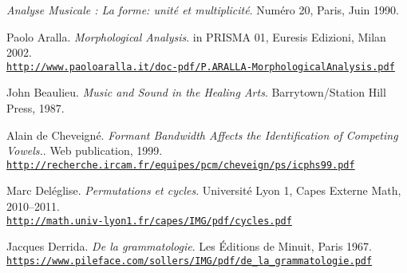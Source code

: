 \renewcommand{\bibname}{References
}

\renewcommand\bibpreamble{$\rightarrow$ The references to go further or deeper for advanced readers are prepended by an asterisk.}

\begin{thebibliography}{99}
\thispagestyle{empty}
		
	\textit{Analyse Musicale : La forme: unité et multiplicité}. Numéro 20, Paris, Juin 1990.
	
	Paolo Aralla. \textit{Morphological Analysis}. in PRISMA 01, Euresis Edizioni, Milan 2002.\\ 
	\href{http://www.paoloaralla.it/doc-pdf/P.ARALLA-MorphologicalAnalysis.pdf}{\scriptsize{\texttt{http://www.paoloaralla.it/doc-pdf/P.ARALLA-MorphologicalAnalysis.pdf}}} \normalsize{}
	
	John Beaulieu. \textit{Music and Sound in the Healing Arts}. Barrytown/Station Hill Press, 1987.
	
	Alain de Cheveign\'{e}. \textit{Formant Bandwidth Affects the Identification of Competing Vowels.}. Web publication, 1999.\\ \href{http://recherche.ircam.fr/equipes/pcm/cheveign/ps/icphs99.pdf}{\scriptsize{\texttt{http://recherche.ircam.fr/equipes/pcm/cheveign/ps/icphs99.pdf}}} \normalsize{}

		
	Marc Del\'{e}glise. \textit{Permutations et cycles}. Universit\'{e} Lyon 1, Capes Externe Math, 2010--2011.\\ \href{http://math.univ-lyon1.fr/capes/IMG/pdf/cycles.pdf}{\scriptsize{\texttt{http://math.univ-lyon1.fr/capes/IMG/pdf/cycles.pdf}}} \normalsize{}
	
	Jacques Derrida. \textit{De la grammatologie}. Les \'{E}ditions de Minuit, Paris 1967.\\ 
	\href{https://www.pileface.com/sollers/IMG/pdf/de\_la\_grammatologie.pdf}{\scriptsize{\texttt{https://www.pileface.com/sollers/IMG/pdf/de\_la\_grammatologie.pdf}}} \normalsize{}
	

\end{thebibliography}
